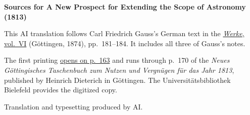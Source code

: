 \clearpage\thispagestyle{empty}
\begin{center}\textbf{Sources for A New Prospect for Extending the Scope of Astronomy (1813)}\end{center}
\noindent This AI translation follows Carl Friedrich Gauss’s German text in the \href{https://gdz.sub.uni-goettingen.de/id/PPN236007467}{\textit{Werke}, vol.~VI} (Göttingen, 1874), pp.~181--184. It includes all three of Gauss’s notes.
\par\smallskip\noindent The first printing \href{https://ds.ub.uni-bielefeld.de/viewer/api/v1/records/2319262_013/files/images/00000197.tif/full/1250,/0/default.jpg}{opens on p.~163} and runs through p.~170 of the \textit{Neues Göttingisches Taschenbuch zum Nutzen und Vergnügen für das Jahr 1813}, published by Heinrich Dieterich in Göttingen. The Universitätsbibliothek Bielefeld provides the digitized copy.
\par\smallskip\noindent Translation and typesetting produced by AI.
\clearpage

